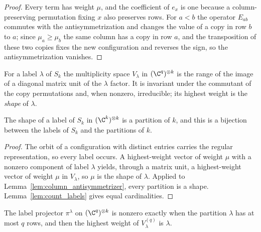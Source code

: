\begin{proof}\leanok
    Every term has weight $\mu$, and the coefficient of $e_x$ is one because a
    column-preserving permutation fixing $x$ also preserves rows. For $a<b$ the
    operator $E_{ab}$ commutes with the antisymmetrization and changes the value
    of a copy in row $b$ to $a$; since $\mu_a\ge\mu_b$ the same column has a copy
    in row $a$, and the transposition of these two copies fixes the new
    configuration and reverses the sign, so the antisymmetrization vanishes.
\end{proof}

For a label $\lambda$ of $S_k$ the multiplicity space $V_\lambda$ in
$(\C^q)^{\otimes k}$ is the range of the image of a diagonal matrix unit of the
$\lambda$ factor. It is invariant under the commutant of the copy permutations
and, when nonzero, irreducible; its highest weight is the \emph{shape} of
$\lambda$.

\begin{theorem}
    \label{thm:labels_are_partitions}
    \leanok
    The shape of a label of $S_k$ in $(\C^k)^{\otimes k}$ is a partition of $k$,
    and this is a bijection between the labels of $S_k$ and the partitions
    of $k$.
\end{theorem}

\begin{proof}\leanok
    The orbit of a configuration with distinct entries carries the regular
    representation, so every label occurs. A highest-weight vector of weight
    $\mu$ with a nonzero component of label $\lambda$ yields, through a matrix
    unit, a highest-weight vector of weight $\mu$ in $V_\lambda$, so $\mu$ is the
    shape of $\lambda$. Applied to Lemma~\ref{lem:column_antisymmetrizer}, every
    partition is a shape. Lemma~\ref{lem:count_labels} gives equal cardinalities.
\end{proof}

\begin{theorem}
    \label{thm:schur_weyl_labels}
    \leanok
    The label projector $\pi^\lambda$ on $(\C^q)^{\otimes k}$ is nonzero exactly
    when the partition $\lambda$ has at most $q$ rows, and then the highest
    weight of $V^{(q)}_\lambda$ is $\lambda$.
\end{theorem}

